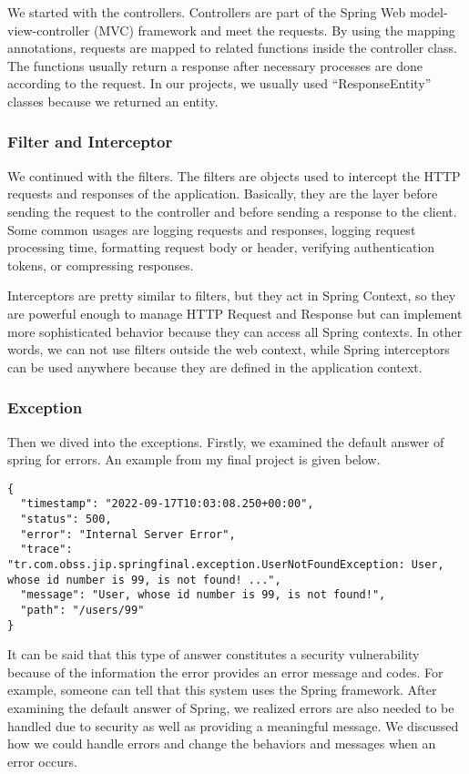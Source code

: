 We started with the controllers. Controllers are part of the Spring Web model-view-controller (MVC) framework and meet the requests. By using the mapping annotations, requests are mapped to related functions inside the controller class. The functions usually return a response after necessary processes are done according to the request. In our projects, we usually used ``ResponseEntity'' classes because we returned an entity.

\subsubsection{Filter and Interceptor}

We continued with the filters. The filters are objects used to intercept the HTTP requests and responses of the application. Basically, they are the layer before sending the request to the controller and before sending a response to the client. Some common usages are logging requests and responses, logging request processing time, formatting request body or header, verifying authentication tokens, or compressing responses.

Interceptors are pretty similar to filters, but they act in Spring Context, so they are powerful enough to manage HTTP Request and Response but can implement more sophisticated behavior because they can access all Spring contexts. In other words, we can not use filters outside the web context, while Spring interceptors can be used anywhere because they are defined in the application context.

\subsubsection{Exception}

Then we dived into the exceptions. Firstly, we examined the default answer of spring for errors. An example from my final project is given below. 
\begin{verbatim}
{
  "timestamp": "2022-09-17T10:03:08.250+00:00",
  "status": 500,
  "error": "Internal Server Error",
  "trace": "tr.com.obss.jip.springfinal.exception.UserNotFoundException: User, whose id number is 99, is not found! ...",
  "message": "User, whose id number is 99, is not found!",
  "path": "/users/99"
}
\end{verbatim}

It can be said that this type of answer constitutes a security vulnerability because of the information the error provides an error message and codes. For example, someone can tell that this system uses the Spring framework. After examining the default answer of Spring, we realized errors are also needed to be handled due to security as well as providing a meaningful message. We discussed how we could handle errors and change the behaviors and messages when an error occurs.

